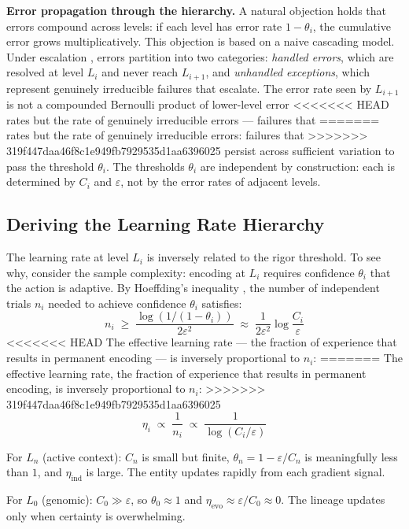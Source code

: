\documentclass[11pt]{article}
\theoremstyle{definition}
\begin{document}
\textbf{Error propagation through the hierarchy.} A natural objection
holds that errors compound across levels: if each level has error rate
$1 - \theta_i$, the cumulative error grows multiplicatively. This
objection is based on a naive cascading model. Under escalation
\cite{McCarthy2026b}, errors partition into two categories:
\emph{handled errors}, which are resolved at level $L_i$ and never
reach $L_{i+1}$, and \emph{unhandled exceptions}, which represent
genuinely irreducible failures that escalate. The error rate seen by
$L_{i+1}$ is not a compounded Bernoulli product of lower-level error
<<<<<<< HEAD
rates but the rate of genuinely irreducible errors --- failures that
=======
rates but the rate of genuinely irreducible errors: failures that
>>>>>>> 319f447daa46f8c1e949fb7929535d1aa6396025
persist across sufficient variation to pass the threshold $\theta_i$.
The thresholds $\theta_i$ are independent by construction: each is
determined by $C_i$ and $\varepsilon$, not by the error rates of
adjacent levels.

\subsection{Deriving the Learning Rate Hierarchy}

The learning rate at level $L_i$ is inversely related to the rigor
threshold. To see why, consider the sample complexity: encoding at
$L_i$ requires confidence $\theta_i$ that the action is adaptive. By
Hoeffding's inequality \cite{Hoeffding1963}, the number of independent
trials $n_i$ needed to achieve confidence $\theta_i$ satisfies:
\[
n_i \;\geq\; \frac{\log(1/(1 - \theta_i))}{2\varepsilon^2}
\;\approx\; \frac{1}{2\varepsilon^2} \log \frac{C_i}{\varepsilon}
\]
<<<<<<< HEAD
The effective learning rate --- the fraction of experience that results
in permanent encoding --- is inversely proportional to $n_i$:
=======
The effective learning rate, the fraction of experience that results
in permanent encoding, is inversely proportional to $n_i$:
>>>>>>> 319f447daa46f8c1e949fb7929535d1aa6396025
\[
\eta_i \;\propto\; \frac{1}{n_i}
\;\propto\; \frac{1}{\log(C_i / \varepsilon)}
\]

For $L_n$ (active context): $C_n$ is small but finite,
$\theta_n = 1 - \varepsilon / C_n$ is meaningfully less than $1$, and
$\eta_{\mathrm{ind}}$ is large. The entity updates rapidly from each
gradient signal.

For $L_0$ (genomic): $C_0 \gg \varepsilon$, so $\theta_0 \approx 1$
and $\eta_{\mathrm{evo}} \approx \varepsilon / C_0 \approx 0$. The
lineage updates only when certainty is overwhelming.
\end{document}
